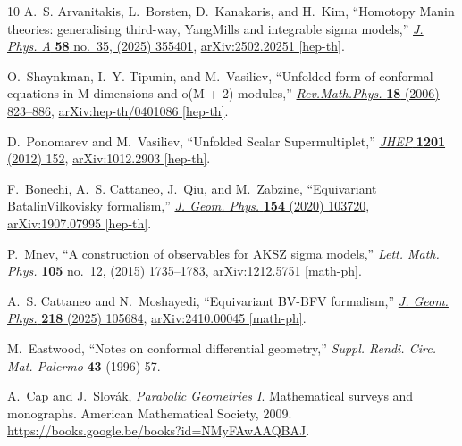 \documentclass[a4paper,12pt]{article}
\numberwithin{equation}{section} %
\begin{document}
\begin{thebibliography}{10}
A.~S. Arvanitakis, L.~Borsten, D.~Kanakaris, and H.~Kim, ``{Homotopy Manin theories: generalising third-way, Yang{\textendash}Mills and integrable sigma models},'' \href{http://dx.doi.org/10.1088/1751-8121/adfc17}{{\em J. Phys. A} {\bfseries 58} no.~35, (2025) 355401}, \href{http://arxiv.org/abs/2502.20251}{{\ttfamily arXiv:2502.20251 [hep-th]}}.

O.~Shaynkman, I.~Y. Tipunin, and M.~Vasiliev, ``{U}nfolded form of conformal equations in {M} dimensions and o({M} + 2) modules,'' \href{http://dx.doi.org/10.1142/S0129055X06002814}{{\em Rev.Math.Phys.} {\bfseries 18} (2006) 823--886},
\href{http://arxiv.org/abs/hep-th/0401086}{{\ttfamily arXiv:hep-th/0401086 [hep-th]}}.

D.~Ponomarev and M.~Vasiliev, ``{U}nfolded {S}calar {S}upermultiplet,'' \href{http://dx.doi.org/10.1007/JHEP01(2012)152}{{\em JHEP} {\bfseries 1201} (2012) 152},
\href{http://arxiv.org/abs/1012.2903}{{\ttfamily arXiv:1012.2903 [hep-th]}}.

F.~Bonechi, A.~S. Cattaneo, J.~Qiu, and M.~Zabzine, ``{Equivariant Batalin\textendash{}Vilkovisky formalism},'' \href{http://dx.doi.org/10.1016/j.geomphys.2020.103720}{{\em J. Geom. Phys.} {\bfseries 154} (2020) 103720}, \href{http://arxiv.org/abs/1907.07995}{{\ttfamily arXiv:1907.07995 [hep-th]}}.

P.~Mnev, ``{A construction of observables for AKSZ sigma models},'' \href{http://dx.doi.org/10.1007/s11005-015-0788-4}{{\em Lett. Math. Phys.} {\bfseries 105} no.~12, (2015) 1735--1783}, \href{http://arxiv.org/abs/1212.5751}{{\ttfamily arXiv:1212.5751 [math-ph]}}.

A.~S. Cattaneo and N.~Moshayedi, ``{Equivariant BV-BFV formalism},'' \href{http://dx.doi.org/10.1016/j.geomphys.2025.105684}{{\em J. Geom. Phys.} {\bfseries 218} (2025) 105684}, \href{http://arxiv.org/abs/2410.00045}{{\ttfamily arXiv:2410.00045 [math-ph]}}.

M.~Eastwood, ``{N}otes on conformal differential geometry,'' {\em Suppl. Rendi. Circ. Mat. Palermo} {\bfseries 43} (1996) 57.

A.~Cap and J.~Slov{\'a}k, {\em Parabolic Geometries I}.
\newblock Mathematical surveys and monographs. American Mathematical Society, 2009.
\newblock \url{https://books.google.be/books?id=NMyFAwAAQBAJ}.


\end{thebibliography}
\end{document}
